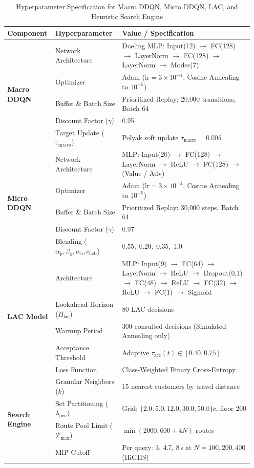 \documentclass{ieeeaccess}
\begin{document}
\begin{table}[!t]
\caption{Hyperparameter Specification for Macro DDQN, Micro DDQN, LAC, and Heuristic Search Engine}
\label{tab:hyperparameters}
\centering
\scriptsize
\renewcommand{\arraystretch}{0.92}
\setlength{\tabcolsep}{2pt}
\begin{tabularx}{\columnwidth}{l l X}
\toprule
\textbf{Component} & \textbf{Hyperparameter} & \textbf{Value / Specification} \\
\midrule
\multirow{5}{*}{\textbf{Macro DDQN}}
  & Network Architecture & Dueling MLP: Input(12) $\to$ FC(128) $\to$ LayerNorm $\to$ FC(128) $\to$ LayerNorm $\to$ Modes(7) \\
  & Optimizer & Adam ($\text{lr} = 3 \times 10^{-4}$, Cosine Annealing to $10^{-5}$) \\
  & Buffer \& Batch Size & Prioritized Replay: 20,000 transitions, Batch 64 \\
  & Discount Factor ($\gamma$) & 0.95 \\
  & Target Update ($\tau_{\text{macro}}$) & Polyak soft update $\tau_{\text{macro}} = 0.005$ \\
\midrule
\multirow{5}{*}{\textbf{Micro DDQN}} 
  & Network Architecture & MLP: Input(20) $\to$ FC(128) $\to$ LayerNorm $\to$ ReLU $\to$ FC(128) $\to$ (Value / Adv) \\
  & Optimizer & Adam ($\text{lr} = 3 \times 10^{-4}$, Cosine Annealing to $10^{-5}$) \\
  & Buffer \& Batch Size & Prioritized Replay: 30,000 steps, Batch 64 \\
  & Discount Factor ($\gamma$) & 0.97 \\
  & Blending ($\alpha_{\text{p}}, \beta_{\text{b}}, \alpha_{\text{u}}, c_{\text{ucb}}$) & $0.55, \; 0.20, \; 0.35, \; 1.0$ \\
\midrule
\multirow{5}{*}{\textbf{LAC Model}} 
  & Architecture & MLP: Input(9) $\to$ FC(64) $\to$ LayerNorm $\to$ ReLU $\to$ Dropout(0.1) $\to$ FC(48) $\to$ ReLU $\to$ FC(32) $\to$ ReLU $\to$ FC(1) $\to$ Sigmoid \\
  & Lookahead Horizon ($H_{\text{lac}}$) & 80 LAC decisions \\
  & Warmup Period & 300 consulted decisions (Simulated Annealing only) \\
  & Acceptance Threshold & Adaptive $\tau_{\text{acc}}(t) \in [0.40, 0.75]$ \\
  & Loss Function & Class-Weighted Binary Cross-Entropy \\
\midrule
\multirow{4}{*}{\textbf{Search Engine}} 
  & Granular Neighbors ($k$) & 15 nearest customers by travel distance \\
  & Set Partitioning ($\lambda_{\text{pen}}$) & Grid: $\{2.0, 5.0, 12.0, 30.0, 50.0\}\bar{c}$, floor 200 \\
  & Route Pool Limit ($\mathcal{P}_{\max}$) & $\min(2000, 600 + 4N)$ routes \\
  & MIP Cutoff & Per query: 3, 4.7, 8\,s at $N=100, 200, 400$ (HiGHS) \\
\bottomrule
\end{tabularx}
\end{table}
\end{document}

